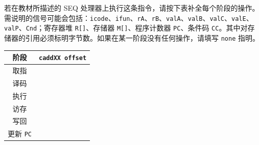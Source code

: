 \begin{problems}
        若在教材所描述的 SEQ 处理器上执行这条指令，请按下表补全每个阶段的操作。需说明的信号可能会包括：\verb|icode|、\verb|ifun|、\verb|rA|、\verb|rB|、\verb|valA|、\verb|valB|、\verb|valC|、\verb|valE|、\verb|valP|、\verb|Cnd|；寄存器堆 \verb|R[]|、存储器 \verb|M[]|、程序计数器 \verb|PC|、条件码 \verb|CC|。其中对存储器的引用必须标明字节数。如果在某一阶段没有任何操作，请填写 \texttt{none} 指明。
        \begin{table}[H]
            \centering
            \begin{tabular}{|c|c|}
                \hline
                阶段 & {\qquad \qquad \qquad \qquad} \verb|caddXX offset| {\qquad \qquad \qquad \qquad} \\ \hline
                取指 & \rule{0pt}{8ex} \\ \hline
                译码 & \rule{0pt}{8ex} \\ \hline
                执行 & \rule{0pt}{8ex} \\ \hline
                访存 & \rule{0pt}{8ex} \\ \hline
                写回 & \rule{0pt}{8ex} \\ \hline
                更新 \verb|PC| & \rule{0pt}{8ex} \\ \hline
            \end{tabular}
        \end{table}
    \end{problems}